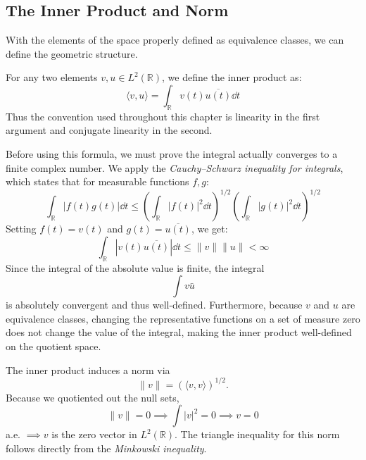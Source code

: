 \subsection{The Inner Product and Norm}

With the elements of the space properly defined as equivalence classes, we can define the geometric structure.

\begin{definition}
For any two elements $v, u \in L^2(\mathbb{R})$, we define the inner product as:
\begin{equation}
\langle v, u \rangle = \int_\mathbb{R} v(t) \overline{u(t)} \dd t
\end{equation}
Thus the convention used throughout this chapter is linearity in the
first argument and conjugate linearity in the second.

\end{definition}

\begin{remark}
Before using this formula, we must prove the integral actually converges to a finite complex number. We apply the \textit{Cauchy--Schwarz inequality for integrals}, which states that for measurable functions $f, g$:
\begin{equation}
\int_\mathbb{R} |f(t) g(t)| \dd t \leq \left( \int_\mathbb{R} |f(t)|^2 \dd t \right)^{1/2} \left( \int_\mathbb{R} |g(t)|^2 \dd t \right)^{1/2}
\end{equation}
Setting $f(t) = v(t)$ and $g(t) = \overline{u(t)}$, we get:
\begin{equation}
\int_\mathbb{R} |v(t) \overline{u(t)}| \dd t \leq \|v\| \|u\| < \infty
\end{equation}
Since the integral of the absolute value is finite, the integral \[
\int v \bar{u}
\] is absolutely convergent and thus well-defined. Furthermore, because $v$ and $u$ are equivalence classes, changing the representative functions on a set of measure zero does not change the value of the integral, making the inner product well-defined on the quotient space.
\end{remark}

The inner product induces a norm via
\[
\|v\| = (\langle v, v \rangle)^{1/2}.
\]
Because we quotiented out the null sets, \[
\|v\| = 0 \implies \int |v|^2 = 0 \implies v = 0
\] a.e. $\implies v$ is the zero vector in $L^2(\mathbb{R})$. The triangle inequality for this norm follows directly from the \textit{Minkowski inequality}.

